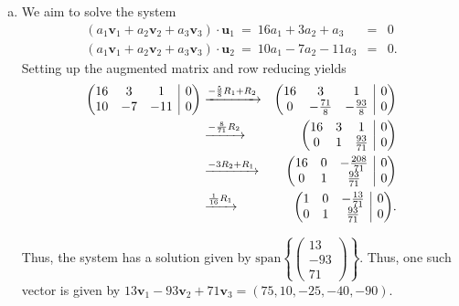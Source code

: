 \documentclass{article}
\makeatletter
\newcommand{\spn}{\text{span}}
\newenvironment{rowequmat}[1]{\left(\array{@{}#1@{}}}{\endarray\right)}
\makeatother
\begin{document}
\begin{enumerate}[(a)]
\item We aim to solve the system
\begin{eqnarray*}
(a_1\textbf{v}_1+a_2\textbf{v}_2+a_3\textbf{v}_3)\cdot \textbf{u}_1\ =\ 16a_1+3a_2+a_3&=&0\\
(a_1\textbf{v}_1+a_2\textbf{v}_2+a_3\textbf{v}_3)\cdot \textbf{u}_2\ =\ 10a_1-7a_2-11a_3&=&0.
\end{eqnarray*}
Setting up the augmented matrix and row reducing yields
\begin{eqnarray*}
\begin{rowequmat}{ccc|c}
     16 &  3 & 1 &0\\
     10 &  -7 & -11 &0 
\end{rowequmat}&\xrightarrow{-\frac{5}{8}R_1+R_2}&\begin{rowequmat}{ccc|c}
     16 &  3 & 1 &0\\
     0 &  -\frac{71}{8} & -\frac{93}{8} &0 
\end{rowequmat}\\
&\xrightarrow{-\frac{8}{71}R_2}&\begin{rowequmat}{ccc|c}
     16 &  3 & 1 &0\\
     0 &  1 & \frac{93}{71} &0 
\end{rowequmat}\\
&\xrightarrow{-3R_2+R_1}&\begin{rowequmat}{ccc|c}
     16 &  0 & -\frac{208}{71} &0\\
     0 &  1 & \frac{93}{71} &0 
\end{rowequmat}\\
&\xrightarrow{\frac{1}{16}R_1}&\begin{rowequmat}{ccc|c}
     1 &  0 & -\frac{13}{71} &0\\
     0 &  1 & \frac{93}{71} &0 
\end{rowequmat}.
\end{eqnarray*}

Thus, the system has a solution given by $\spn\left\{\begin{pmatrix}13\\-93\\71\end{pmatrix}\right\}.$ Thus, one such vector is given by $13\textbf{v}_1-93\textbf{v}_2+71\textbf{v}_3=(75,10,-25,-40,-90).$
\end{enumerate}
\end{document}
